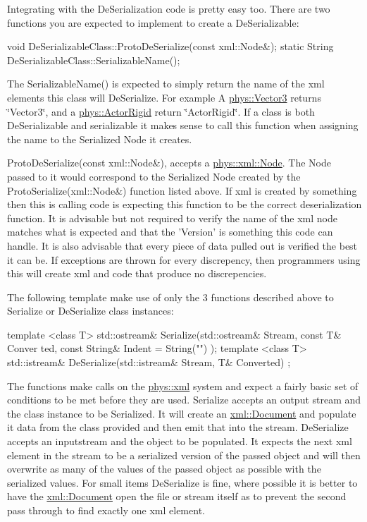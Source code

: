  \par
 Integrating with the DeSerialization code is pretty easy too. There are two functions you are expected to implement to create a DeSerializable: 
\begin{DoxyCode}
 void DeSerializableClass::ProtoDeSerialize(const xml::Node&);
 static String DeSerializableClass::SerializableName();
\end{DoxyCode}
 The SerializableName() is expected to simply return the name of the xml elements this class will DeSerialize. For example A \hyperlink{classphys_1_1Vector3}{phys::Vector3} returns \char`\"{}Vector3\char`\"{}, and a \hyperlink{classphys_1_1ActorRigid}{phys::ActorRigid} return \char`\"{}ActorRigid\char`\"{}. If a class is both DeSerializable and serializable it makes sense to call this function when assigning the name to the Serialized Node it creates. \par
 \par
 ProtoDeSerialize(const xml::Node\&), accepts a \hyperlink{classphys_1_1xml_1_1Node}{phys::xml::Node}. The Node passed to it would correspond to the Serialized Node created by the ProtoSerialize(xml::Node\&) function listed above. If xml is created by something then this is calling code is expecting this function to be the correct deserialization function. It is advisable but not required to verify the name of the xml node matches what is expected and that the 'Version' is something this code can handle. It is also advisable that every piece of data pulled out is verified the best it can be. If exceptions are thrown for every discrepency, then programmers using this will create xml and code that produce no discrepencies. \par
 \par
 The following template make use of only the 3 functions described above to Serialize or DeSerialize class instances: 
\begin{DoxyCode}
 template <class T> std::ostream& Serialize(std::ostream& Stream, const T& Conver
      ted, const String& Indent = String("") );
 template <class T> std::istream& DeSerialize(std::istream& Stream, T& Converted)
      ;
\end{DoxyCode}
 The functions make calls on the \hyperlink{namespacephys_1_1xml}{phys::xml} system and expect a fairly basic set of conditions to be met before they are used. Serialize accepts an output stream and the class instance to be Serialized. It will create an \hyperlink{classphys_1_1xml_1_1Document}{xml::Document} and populate it data from the class provided and then emit that into the stream. DeSerialize accepts an inputstream and the object to be populated. It expects the next xml element in the stream to be a serialized version of the passed object and will then overwrite as many of the values of the passed object as possible with the serialized values. For small items DeSerialize is fine, where possible it is better to have the \hyperlink{classphys_1_1xml_1_1Document}{xml::Document} open the file or stream itself as to prevent the second pass through to find exactly one xml element. \par
